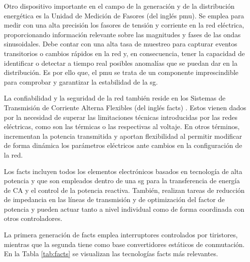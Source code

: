 \vspace{3mm}

Otro dispositivo importante en el campo de la generación y de la distribución energética es la Unidad de Medición de Fasores (del inglés \gls{pmu}). Se emplea para medir con una alta precisión los fasores de tensión y corriente en la red eléctrica, proporcionando información relevante sobre las magnitudes y fases de las ondas sinusoidales. Debe contar con una alta tasa de muestreo para capturar eventos transitorios o cambios rápidos en la red y, en consecuencia, tener la capacidad de identificar o detectar a tiempo real posibles anomalías que se puedan dar en la distribución. Es por ello que, el \gls{pmu} se trata de un componente imprescindible para comprobar y garantizar la estabilidad de la \gls{sg}. %

\vspace{3mm}

La confiabilidad y la seguridad de la red también reside en los Sistemas de Transmisión de Corriente Alterna Flexibles (del inglés \gls{facts}) \cite{facts} \cite{facts3}. Estos vienen dados por la necesidad de superar las limitaciones técnicas introducidas por las redes eléctricas, como son las térmicas o las respectivas al voltaje. En otros términos, incrementan la potencia transmitida y aportan flexibilidad al permitir modificar de forma dinámica los parámetros eléctricos ante cambios en la configuración de la red. 

\vspace{3mm}

Los \gls{facts} incluyen todos los elementos electrónicos basados en tecnología de alta potencia y que son empleados dentro de una \gls{sg} para la transferencia de energía de CA y el control de la potencia reactiva. También, realizan tareas de reducción de impedancia en las líneas de transmisión y de optimización del factor de potencia y pueden actuar tanto a nivel individual como de forma coordinada con otros controladores.

\vspace{3mm}

La primera generación de \gls{facts} emplea interruptores controlados por tiristores, mientras que la segunda tiene como base convertidores estáticos de conmutación. En la Tabla \ref{tab:facts} se visualizan las tecnologías \gls{facts} más relevantes. \cite{facts2} \cite{facts3}

\vspace{3mm}


